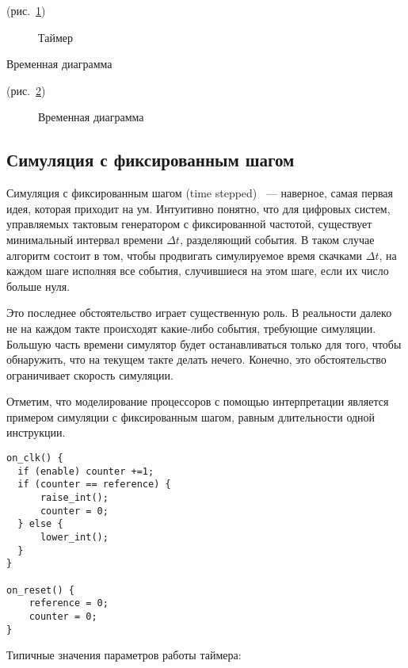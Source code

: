 (рис.~\ref{fig:periodic-timer})

\begin{figure}[htp]
    \centering
    \caption[Таймер]{Таймер}
    \label{fig:periodic-timer}
\end{figure}


Временная диаграмма

(рис.~\ref{fig:timer-diagram})

\begin{figure}[htp]
    \centering
    \caption[Временная диаграмма]{Временная диаграмма}
    \label{fig:timer-diagram}
\end{figure}

\subsection{Симуляция с фиксированным шагом}

Симуляция с фиксированным шагом (\abbr time stepped)~\cite{ferscha-1995-pdes} --- наверное, самая первая идея, которая приходит на ум. Интуитивно понятно, что для цифровых систем, управляемых тактовым генератором с фиксированной частотой, существует минимальный интервал времени $\Delta t$, разделяющий события. В таком случае алгоритм состоит в том, чтобы продвигать симулируемое время скачками $\Delta t$, на каждом шаге исполняя все события, случившиеся на этом шаге, если их число больше нуля.

Это последнее обстоятельство играет существенную роль. В реальности далеко не на каждом такте происходят какие-либо события, требующие симуляции. Большую часть времени симулятор будет останавливаться только для того, чтобы обнаружить, что на текущем такте делать нечего. Конечно, это обстоятельство ограничивает скорость симуляции.

Отметим, что моделирование процессоров с помощью интерпретации является примером симуляции с фиксированным шагом, равным длительности одной инструкции.

\begin{lstlisting}
on_clk() {
  if (enable) counter +=1;
  if (counter == reference) {
      raise_int();
      counter = 0;
  } else {
      lower_int();
  }
}

on_reset() {
    reference = 0;
    counter = 0;
}
\end{lstlisting}

Типичные значения параметров работы таймера:

